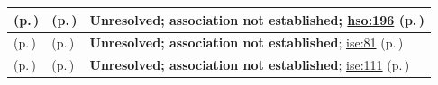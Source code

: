 \begin{longtable}{|>{\raggedright\arraybackslash}p{0.32\TableWidth}|>{\raggedright\arraybackslash}p{0.32\TableWidth}|>{\raggedright\arraybackslash}p{0.36\TableWidth}|}
\nameref{function:track-operational-staff-presence} (p.\,\pageref{function:track-operational-staff-presence}) & \nameref{feature:feat-hso-16} (p.\,\pageref{feature:feat-hso-16}) & \textbf{Unresolved; association not established}; \hyperref[rad:hso:190]{hso:196} (p.\,\pageref{rad:hso:190})\\\hline
\nameref{function:retrieve-health-information} (p.\,\pageref{function:retrieve-health-information}) & \nameref{feature:feat-ise-09} (p.\,\pageref{feature:feat-ise-09}) & \textbf{Unresolved; association not established}; \hyperref[rad:ise:73]{ise:81} (p.\,\pageref{rad:ise:73})\\\hline
\nameref{function:evaluate-consent-constraint} (p.\,\pageref{function:evaluate-consent-constraint}) & \nameref{feature:feat-ise-12} (p.\,\pageref{feature:feat-ise-12}) & \textbf{Unresolved; association not established}; \hyperref[rad:ise:104]{ise:111} (p.\,\pageref{rad:ise:104})\\\hline
\end{longtable}\endgroup
